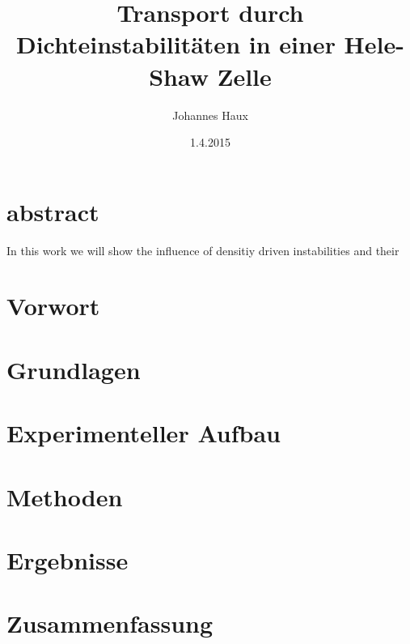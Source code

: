 \documentclass[twoside, a4paper, DIV=11,twocolumn]{book}
\title{Transport durch Dichteinstabilitäten in einer Hele-Shaw Zelle}
\author{Johannes Haux}
\date{1.4.2015}
\begin{document}
\onecolumn


\chapter*{abstract}
  
  In this work we will show the influence of densitiy driven instabilities and their 
\twocolumn
\tableofcontents
\listoffigures

\balance %
\chapter{Vorwort}


\chapter{Grundlagen}


\chapter{Experimenteller Aufbau}


\chapter{Methoden}


\chapter{Ergebnisse}


% 

\chapter{Zusammenfassung}





\end{document}
